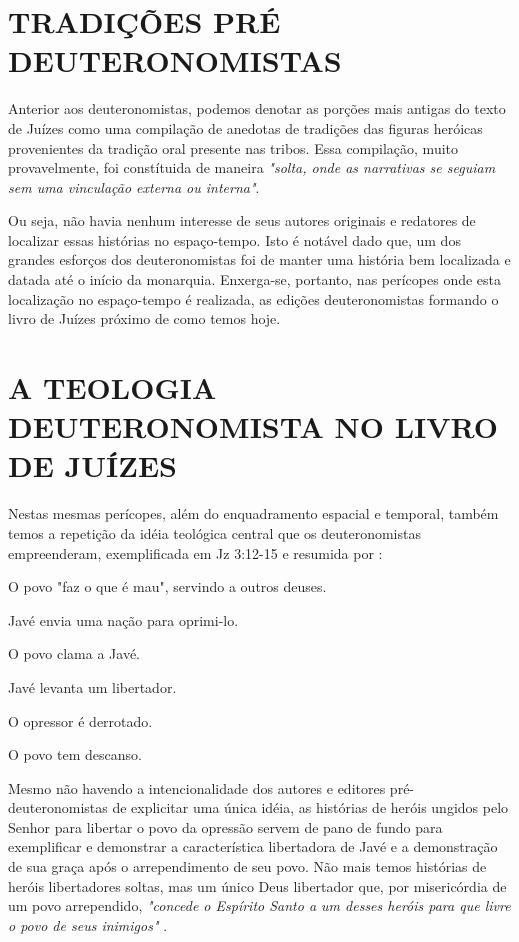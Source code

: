 \documentclass[
    article,            %
	12pt,				%
	oneside,			%
	a4paper,			%
	english,			%
	french,				%
	spanish,			%
	brazil				%
	]{abntex2}
\begin{document}
\section {TRADIÇÕES PRÉ DEUTERONOMISTAS}
Anterior aos deuteronomistas, podemos denotar as porções mais antigas do texto de Juízes como uma compilação de anedotas de tradições das figuras heróicas provenientes da tradição oral presente nas tribos. Essa compilação, muito provavelmente, foi constítuida de maneira \emph{"solta, onde as narrativas se seguiam sem uma vinculação externa ou interna"}\cite[p.292]{FEHRER}.

Ou seja, não havia nenhum interesse de seus autores originais e redatores de localizar essas histórias no espaço-tempo. Isto é notável dado que, um dos grandes esforços dos deuteronomistas foi de manter uma história bem localizada e datada até o início da monarquia. Enxerga-se, portanto, nas perícopes onde esta localização no espaço-tempo é realizada, as edições deuteronomistas formando o livro de Juízes próximo de como temos hoje.

\pagebreak
\section{A TEOLOGIA DEUTERONOMISTA NO LIVRO DE JUÍZES}
Nestas mesmas perícopes, além do enquadramento espacial e temporal, também temos a repetição da idéia teológica central que os deuteronomistas empreenderam, exemplificada em Jz 3:12-15 e resumida por :
\begin{citacao}
O povo "faz o que é mau", servindo a outros deuses.

Javé envia uma nação para oprimi-lo.

O povo clama a Javé.

Javé levanta um libertador.

O opressor é derrotado.

O povo tem descanso. \cite[p.167]{LASOR}
\end{citacao}

Mesmo não havendo a intencionalidade dos autores e editores pré-deuteronomistas de explicitar uma única idéia, as histórias de heróis ungidos pelo Senhor para libertar o povo da opressão servem de pano de fundo para exemplificar e demonstrar a característica libertadora de Javé e a demonstração de sua graça após o arrependimento de seu povo. Não mais temos histórias de heróis libertadores soltas, mas um único Deus libertador que, por misericórdia de um povo arrependido, \emph{"concede o Espírito Santo a um desses heróis para que livre o povo de seus inimigos"} \cite[p.176]{LASOR}.
\end{document}

